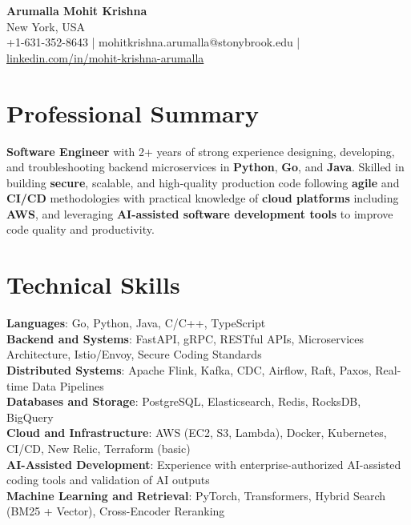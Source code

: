 \documentclass[letterpaper,11pt]{article}
\begin{document}
\begin{center}
  {\Large \textbf{Arumalla Mohit Krishna}} \\
  New York, USA \\
  +1-631-352-8643 \enspace | \enspace mohitkrishna.arumalla@stonybrook.edu \enspace | \enspace \href{https://www.linkedin.com/in/mohit-krishna-arumalla}{linkedin.com/in/mohit-krishna-arumalla}
\end{center}

\section{Professional Summary}
  \begin{itemize}[leftmargin=0.15in, label={}]
    \small{\item{
     \textbf{Software Engineer} with 2+ years of strong experience designing, developing, and troubleshooting backend microservices in \textbf{Python}, \textbf{Go}, and \textbf{Java}. Skilled in building \textbf{secure}, scalable, and high-quality production code following \textbf{agile} and \textbf{CI/CD} methodologies with practical knowledge of \textbf{cloud platforms} including \textbf{AWS}, and leveraging \textbf{AI-assisted software development tools} to improve code quality and productivity.
    }}
  \end{itemize}
\vspace{-16pt}

\section{Technical Skills}
 \begin{itemize}[leftmargin=0.15in, label={}]
    \small{\item{
     \textbf{Languages}: Go, Python, Java, C/C++, TypeScript \\
     \textbf{Backend and Systems}: FastAPI, gRPC, RESTful APIs, Microservices Architecture, Istio/Envoy, Secure Coding Standards \\
     \textbf{Distributed Systems}: Apache Flink, Kafka, CDC, Airflow, Raft, Paxos, Real-time Data Pipelines \\
     \textbf{Databases and Storage}: PostgreSQL, Elasticsearch, Redis, RocksDB, BigQuery \\
     \textbf{Cloud and Infrastructure}: AWS (EC2, S3, Lambda), Docker, Kubernetes, CI/CD, New Relic, Terraform (basic) \\
     \textbf{AI-Assisted Development}: Experience with enterprise-authorized AI-assisted coding tools and validation of AI outputs \\
     \textbf{Machine Learning and Retrieval}: PyTorch, Transformers, Hybrid Search (BM25 + Vector), Cross-Encoder Reranking
    }}
 \end{itemize}
\vspace{-16pt}
\end{document}
